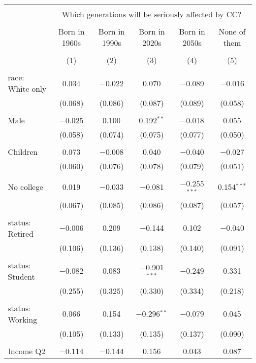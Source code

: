
\begin{tabular}{@{\extracolsep{5pt}}lccccc} 
\\[-1.8ex]\hline 
\hline \\[-1.8ex] 
 & \multicolumn{5}{c}{Which generations will be seriously affected by CC?} \\ 
\cline{2-6} 
\\[-1.8ex] & Born in 1960s & Born in 1990s & Born in 2020s & Born in 2050s & None of them \\ 
\\[-1.8ex] & (1) & (2) & (3) & (4) & (5)\\ 
\hline \\[-1.8ex] 
 race: White only & 0.034 & $-$0.022 & 0.070 & $-$0.089 & $-$0.016 \\ 
  & (0.068) & (0.086) & (0.087) & (0.089) & (0.058) \\ 
  & & & & & \\ 
 Male & $-$0.025 & 0.100 & 0.192$^{**}$ & $-$0.018 & 0.055 \\ 
  & (0.058) & (0.074) & (0.075) & (0.077) & (0.050) \\ 
  & & & & & \\ 
 Children & 0.073 & $-$0.008 & 0.040 & $-$0.040 & $-$0.027 \\ 
  & (0.060) & (0.076) & (0.078) & (0.079) & (0.051) \\ 
  & & & & & \\ 
 No college & 0.019 & $-$0.033 & $-$0.081 & $-$0.255$^{***}$ & 0.154$^{***}$ \\ 
  & (0.067) & (0.085) & (0.086) & (0.087) & (0.057) \\ 
  & & & & & \\ 
 status: Retired & $-$0.006 & 0.209 & $-$0.144 & 0.102 & $-$0.040 \\ 
  & (0.106) & (0.136) & (0.138) & (0.140) & (0.091) \\ 
  & & & & & \\ 
 status: Student & $-$0.082 & 0.083 & $-$0.901$^{***}$ & $-$0.249 & 0.331 \\ 
  & (0.255) & (0.325) & (0.330) & (0.334) & (0.218) \\ 
  & & & & & \\ 
 status: Working & 0.066 & 0.154 & $-$0.296$^{**}$ & $-$0.079 & 0.045 \\ 
  & (0.105) & (0.133) & (0.135) & (0.137) & (0.090) \\ 
  & & & & & \\ 
 Income Q2 & $-$0.114 & $-$0.144 & 0.156 & 0.043 & 0.087 \\ 

\end{tabular}
